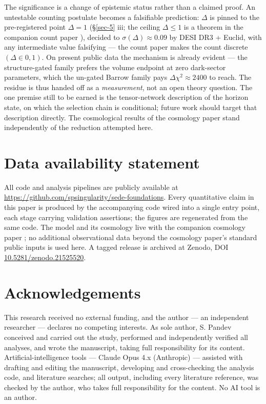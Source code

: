 \documentclass[aps,prd,preprint,nofootinbib,superscriptaddress]{revtex4-2}
\begin{document}
The significance is a change of epistemic status rather than a claimed
proof. An untestable counting postulate becomes a falsifiable
prediction: \(\Delta\) is pinned to the pre-registered point
\(\Delta  = 1\) (§\ref{sec-5} iii; the ceiling \(\Delta  \leq  1\) is a
theorem in the companion count paper \cite{Pandev:2026count}), decided
to \(\sigma (\Delta ) \approx  0.09\) by DESI DR3 + Euclid, with any
intermediate value falsifying --- the count paper makes the count
discrete \((\Delta  \in  {0, 1})\). On present public data the mechanism
is already evident --- the structure-gated family prefers the volume
endpoint at zero dark-sector parameters, which the un-gated Barrow
family pays \(\Delta \chi ^{2} \approx  2400\) to reach. The residue is
thus handed off as a \emph{measurement}, not an open theory question.
The one premise still to be earned is the tensor-network description of
the horizon state, on which the selection chain is conditional; future
work should target that description directly. The cosmological results
of the cosmology paper stand independently of the reduction attempted
here.

\section*{Data availability
statement}\label{data-availability-statement}

All code and analysis pipelines are publicly available at
\url{https://github.com/spsingularity/sede-foundations}. Every
quantitative claim in this paper is produced by the accompanying code
wired into a single entry point, each stage carrying validation
assertions; the figures are regenerated from the same code. The model
and its cosmology live with the companion cosmology paper
\cite{Pandev:2026cosmology}; no additional observational data beyond
the cosmology paper's standard public inputs is used here. A tagged
release is archived at Zenodo, DOI
\href{https://doi.org/10.5281/zenodo.21525520}{10.5281/zenodo.21525520}.

\section*{Acknowledgements}\label{acknowledgements}

This research received no external funding, and the author --- an
independent researcher --- declares no competing interests. As sole
author, S. Pandev conceived and carried out the study, performed and
independently verified all analyses, and wrote the manuscript, taking
full responsibility for its content. Artificial-intelligence tools ---
Claude Opus 4.x (Anthropic) --- assisted with drafting and editing the
manuscript, developing and cross-checking the analysis code, and
literature searches; all output, including every literature reference,
was checked by the author, who takes full responsibility for the
content. No AI tool is an author.



\end{document}
